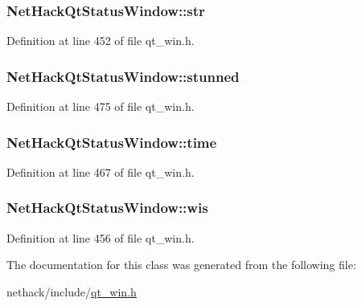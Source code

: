 \hypertarget{classNetHackQtStatusWindow_aa0a39d20b197130cf6186fcd7ca0c0c6}{
\subsubsection[{str}]{ Net\+Hack\+Qt\+Status\+Window\+::str\hspace{0.3cm}{\ttfamily [private]}}}\label{classNetHackQtStatusWindow_aa0a39d20b197130cf6186fcd7ca0c0c6}


Definition at line 452 of file qt\+\_\+win.\+h.

\hypertarget{classNetHackQtStatusWindow_acd65a8affc935081e12326a9cbbfef75}{
\subsubsection[{stunned}]{ Net\+Hack\+Qt\+Status\+Window\+::stunned\hspace{0.3cm}{\ttfamily [private]}}}\label{classNetHackQtStatusWindow_acd65a8affc935081e12326a9cbbfef75}


Definition at line 475 of file qt\+\_\+win.\+h.

\hypertarget{classNetHackQtStatusWindow_ad470d0d65db02163ed57a99bcb77b325}{
\subsubsection[{time}]{ Net\+Hack\+Qt\+Status\+Window\+::time\hspace{0.3cm}{\ttfamily [private]}}}\label{classNetHackQtStatusWindow_ad470d0d65db02163ed57a99bcb77b325}


Definition at line 467 of file qt\+\_\+win.\+h.

\hypertarget{classNetHackQtStatusWindow_a2f5ab1127f16928d96124d75763ab5c2}{
\subsubsection[{wis}]{ Net\+Hack\+Qt\+Status\+Window\+::wis\hspace{0.3cm}{\ttfamily [private]}}}\label{classNetHackQtStatusWindow_a2f5ab1127f16928d96124d75763ab5c2}


Definition at line 456 of file qt\+\_\+win.\+h.



The documentation for this class was generated from the following file\+:\begin{DoxyCompactItemize}
\item 
nethack/include/\hyperlink{qt__win_8h}{qt\+\_\+win.\+h}\end{DoxyCompactItemize}
